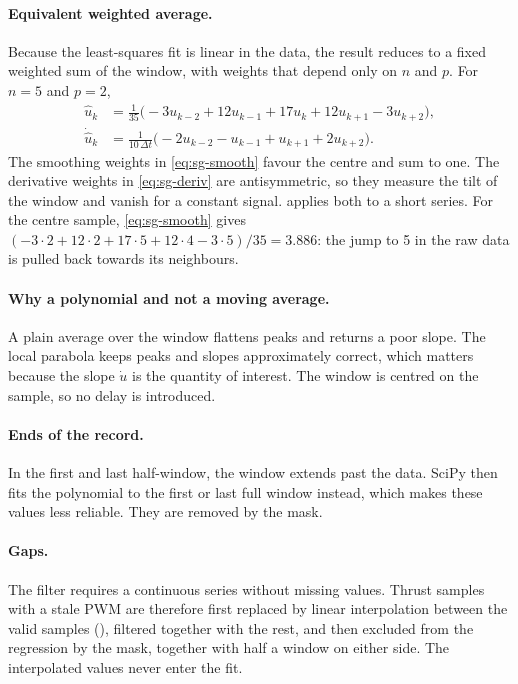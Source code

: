 \begin{revised}[title=Added 16 October 2026,breakable]
\paragraph{Equivalent weighted average.} Because the least-squares fit is linear in the data, the
result reduces to a fixed weighted sum of the window, with weights that depend only on $n$ and
$p$. For $n = 5$ and $p = 2$,
\begin{align}
  \hat u_k &= \tfrac{1}{35}\bigl(-3u_{k-2} + 12u_{k-1} + 17u_k + 12u_{k+1} - 3u_{k+2}\bigr),
  \label{eq:sg-smooth}\\
  \dot{\hat u}_k &= \tfrac{1}{10\,\Delta t}\bigl(-2u_{k-2} - u_{k-1} + u_{k+1} + 2u_{k+2}\bigr).
  \label{eq:sg-deriv}
\end{align}
The smoothing weights in \eqref{eq:sg-smooth} favour the centre and sum to one. The derivative
weights in \eqref{eq:sg-deriv} are antisymmetric, so they measure the tilt of the window and
vanish for a constant signal.  applies both to a short series. For the
centre sample, \eqref{eq:sg-smooth} gives
$(-3\cdot 2 + 12\cdot 2 + 17\cdot 5 + 12\cdot 4 - 3\cdot 5)/35 = 3.886$: the jump to 5 in the
raw data is pulled back towards its neighbours.

\paragraph{Why a polynomial and not a moving average.} A plain average over the window flattens
peaks and returns a poor slope. The local parabola keeps peaks and slopes approximately
correct, which matters because the slope $\dot u$ is the quantity of interest. The window is
centred on the sample, so no delay is introduced.

\paragraph{Ends of the record.} In the first and last half-window, the window extends past the
data. SciPy then fits the polynomial to the first or last full window instead, which makes these
values less reliable. They are removed by the  mask.

\paragraph{Gaps.} The filter requires a continuous series without missing values. Thrust samples
with a stale PWM are therefore first replaced by linear interpolation between the valid samples
(), filtered together with the rest, and then excluded from the regression by the
 mask, together with half a window on either side. The interpolated values never
enter the fit.
\end{revised}

